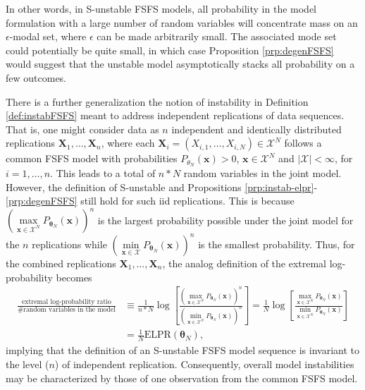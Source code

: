 \documentclass[12pt]{article}
\theoremstyle{definition}
\let\BeginKnitrBlock\begin \let\EndKnitrBlock\end
\begin{document}
In other words, in S-unstable FSFS models, all probability in the model
formulation with a large number of random variables will concentrate
mass on an \(\epsilon\)-modal set, where \(\epsilon\) can be made
arbitrarily small. The associated mode set could potentially be quite
small, in which case Proposition \ref{prp:degenFSFS} would suggest that
the unstable model asymptotically stacks all probability on a few
outcomes.

\BeginKnitrBlock{remark}
\iffalse <span class="remark"><em>Remark. \fi{} There is a further
generalization the notion of instability in Definition
\ref{def:instabFSFS} meant to address independent replications of data
sequences. That is, one might consider data as \(n\) independent and
identically distributed replications
\(\boldsymbol X_1, \dots, \boldsymbol X_n\), where each
\(\boldsymbol X_i=(X_{i,1},\ldots,X_{i,N}) \in \mathcal{X}^N\) follows a
common FSFS model with probabilities \(P_{\theta_N}(\boldsymbol x)>0\),
\(\boldsymbol x\in\mathcal{X}^N\) and \(|\mathcal{X}|<\infty\), for
\(i=1,\ldots,n\). This leads to a total of \(n*N\) random variables in
the joint model. However, the definition of S-unstable and Propositions
\ref{prp:instab-elpr}-\ref{prp:degenFSFS} still hold for such iid
replications. This is because
\(\left(\max\limits_{\boldsymbol x \in \mathcal{X}^N}P_{\boldsymbol \theta_N}(\boldsymbol x)\right)^n\)
is the largest probability possible under the joint model for the \(n\)
replications while
\(\left(\min\limits_{\boldsymbol x \in \mathcal{X}}P_{\boldsymbol \theta_N}(\boldsymbol x)\right)^n\)
is the smallest probability. Thus, for the combined replications
\(\boldsymbol X_1, \ldots, \boldsymbol X_n\), the analog definition of
the extremal log-probability becomes
\begin{align*}
\frac{\text{extremal log-probability ratio}}{\text{\# random variables in the model}} &\equiv \frac{1}{n*N}\log \left[\frac{\left(\max\limits_{\boldsymbol x \in \mathcal{X}^N}P_{\boldsymbol \theta_N}(\boldsymbol x)\right)^n}{\left(\min\limits_{\boldsymbol x \in \mathcal{X}^N}P_{\boldsymbol \theta_N}(\boldsymbol x)\right)^n}\right] = \frac{1}{N} \log \left[\frac{\max\limits_{\boldsymbol x \in \mathcal{X}^N}P_{\boldsymbol \theta_N}(\boldsymbol x)}{\min\limits_{\boldsymbol x \in \mathcal{X}^N}P_{\boldsymbol \theta_N}(\boldsymbol x)}\right] \\
&= \frac{1}{N} \text{ELPR}(\boldsymbol \theta_N),
\end{align*}
implying that the definition of an S-unstable FSFS model sequence is
invariant to the level (\(n\)) of independent replication. Consequently,
overall model instabilities may be characterized by those of one
observation from the common FSFS model.
\EndKnitrBlock{remark}
\end{document}
